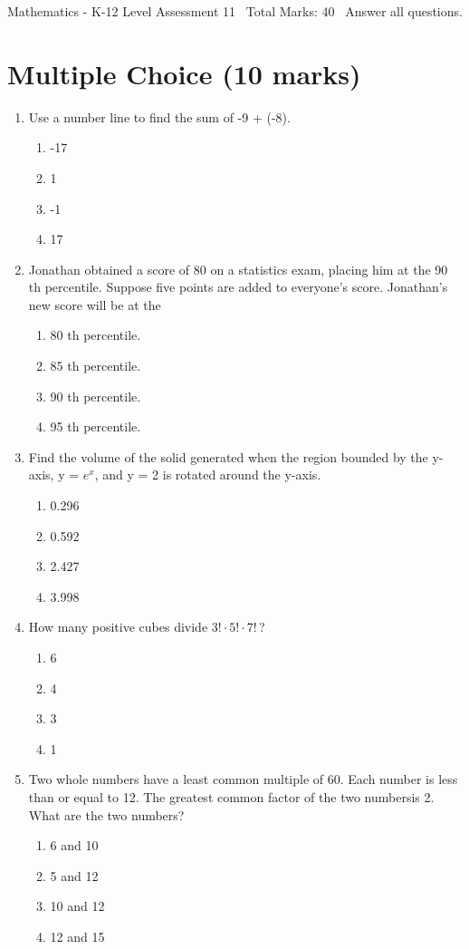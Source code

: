 \documentclass[12pt]{article}
\begin{document}
\begin{center}
Mathematics - K-12 Level Assessment 11 \
Total Marks: 40 \
Answer all questions.
\end{center}

\section*{Multiple Choice (10 marks)}
\begin{enumerate}[label=\arabic*.]
\item Use a number line to find the sum of -9 + (-8).
\begin{enumerate}[label=(\alph*)]
    \item -17
    \item 1
    \item -1
    \item 17
\end{enumerate}
\item Jonathan obtained a score of 80 on a statistics exam, placing him at the 90 th percentile. Suppose five points are added to everyone's score. Jonathan's new score will be at the
\begin{enumerate}[label=(\alph*)]
    \item 80 th percentile.
    \item 85 th percentile.
    \item 90 th percentile.
    \item 95 th percentile.
\end{enumerate}
\item Find the volume of the solid generated when the region bounded by the y-axis, y = $e^x$, and y = 2 is rotated around the y-axis.
\begin{enumerate}[label=(\alph*)]
    \item 0.296
    \item 0.592
    \item 2.427
    \item 3.998
\end{enumerate}
\item How many positive cubes divide $3!\cdot 5!\cdot 7!\,$?
\begin{enumerate}[label=(\alph*)]
    \item 6
    \item 4
    \item 3
    \item 1
\end{enumerate}
\item Two whole numbers have a least common multiple of 60. Each number is less than or equal to 12. The greatest common factor of the two numbersis 2. What are the two numbers?
\begin{enumerate}[label=(\alph*)]
    \item 6 and 10
    \item 5 and 12
    \item 10 and 12
    \item 12 and 15
\end{enumerate}
\end{enumerate}
\end{document}
